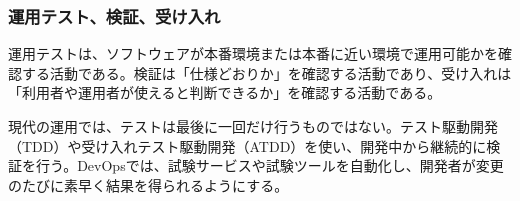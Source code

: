 \subsubsection{運用テスト、検証、受け入れ}

運用テストは、ソフトウェアが本番環境または本番に近い環境で運用可能かを確認する活動である。検証は「仕様どおりか」を確認する活動であり、受け入れは「利用者や運用者が使えると判断できるか」を確認する活動である。

現代の運用では、テストは最後に一回だけ行うものではない。テスト駆動開発（TDD）や受け入れテスト駆動開発（ATDD）を使い、開発中から継続的に検証を行う。DevOpsでは、試験サービスや試験ツールを自動化し、開発者が変更のたびに素早く結果を得られるようにする。
